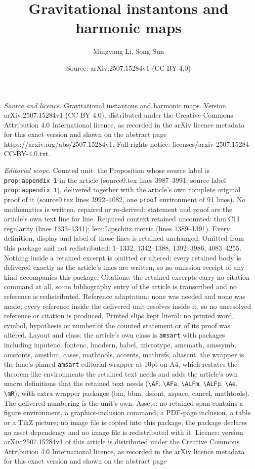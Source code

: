 \documentclass[10pt,a4paper]{amsart}
\title[Gravitational instantons and harmonic maps]{Gravitational instantons and harmonic maps}
\author{Mingyang Li, Song Sun}
\date{Source: arXiv:2507.15284v1 (CC BY 4.0)}
\begin{document}
\maketitle

\noindent\emph{Source and licence.} Gravitational instantons and harmonic maps. Version arXiv:2507.15284v1 (CC BY 4.0), distributed under the Creative Commons Attribution 4.0 International licence, as recorded in the arXiv licence metadata for this exact version and shown on the abstract page https://arxiv.org/abs/2507.15284v1. Full rights notice: licenses/arxiv-2507.15284-CC-BY-4.0.txt.\par\smallskip

\noindent\textit{Editorial scope.} Counted unit: the Proposition whose source label is \texttt{prop:appendix 1} in the article (source0.tex lines 3987--3991, source label \texttt{prop:appendix 1}), delivered together with the article's own complete original proof of it (source0.tex lines 3992--4082, one \texttt{proof} environment of 91 lines). No mathematics is written, repaired or re-derived: statement and proof are the article's own text line for line. Required context retained uncounted: thm:C11 regularity (lines 1333--1341); lem:Lipschitz metric (lines 1389--1391). Every definition, display and label of those lines is retained unchanged. Omitted from this package and not redistributed: 1--1332, 1342--1388, 1392--3986, 4083--4255. Nothing inside a retained excerpt is omitted or altered: every retained body is delivered exactly as the article's lines are written, so no omission receipt of any kind accompanies this package. Citations: the retained excerpts carry no citation command at all, so no bibliography entry of the article is transcribed and no reference is redistributed. Reference adaptation: none was needed and none was made; every reference inside the delivered unit resolves inside it, so no unresolved reference or citation is produced. Printed slips kept literal: no printed word, symbol, hypothesis or number of the counted statement or of its proof was altered. Layout and class: the article's own class is \texttt{amsart} with packages including inputenc, fontenc, lmodern, babel, microtype, amsmath, amssymb, amsfonts, amsthm, cases, mathtools, accents, mathrsfs, aliascnt; the wrapper is the lane's pinned \texttt{amsart} editorial wrapper at 10pt on A4, which restates the theorem-like environments the retained text needs and adds the article's own macro definitions that the retained text needs (\texttt{\textbackslash AF}, \texttt{\textbackslash AFa}, \texttt{\textbackslash ALFm}, \texttt{\textbackslash ALFp}, \texttt{\textbackslash Ae}, \texttt{\textbackslash mR}), with extra wrapper packages (bm, bbm, dsfont, xspace, cancel, mathtools). The delivered numbering is the unit's own. Assets: no retained span contains a figure environment, a graphics-inclusion command, a PDF-page inclusion, a table or a TikZ picture; no image file is copied into this package, the package declares no asset dependency and no image file is redistributed with it. Licence: version arXiv:2507.15284v1 of this article is distributed under the Creative Commons Attribution 4.0 International licence, as recorded in the arXiv licence metadata for this exact version and shown on the abstract page 
\end{document}
